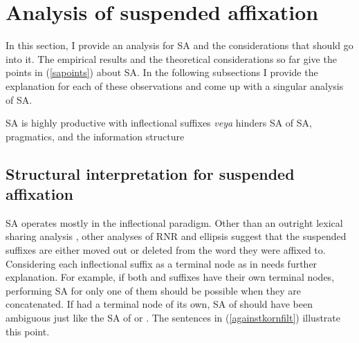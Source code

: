 \section{Analysis of suspended affixation} \label{sec:SAanalysis}

In this section, I provide an analysis for SA and the considerations that should go into it. The empirical results and the theoretical considerations so far give the points in (\ref{sapoints}) about SA. In the following subsections I provide the explanation for each of these observations and come up with a singular analysis of SA.

\begin{exe}
\ex \label{sapoints}
    \begin{xlisti}
    \ex SA is highly productive with inflectional suffixes
    \ex \textit{veya} hinders SA of {\Case} 
    \ex SA, pragmatics, and the information structure
    \end{xlisti}
\end{exe}

\subsection{Structural interpretation for suspended affixation}

SA operates mostly in the inflectional paradigm. Other than an outright lexical sharing analysis \citep{broadwell2008turkish}, other analyses of RNR \citep{kornfilt2012revisiting} and ellipsis \citep{guseva2017postsyntactic, erschler2018suspended} suggest that the suspended suffixes are either moved out or deleted from the word they were affixed to. Considering each inflectional suffix as a terminal node as in \cite{kornfilt2012revisiting} needs further explanation. For example, if both {\Pl} and {\Poss} suffixes have their own terminal nodes, performing SA for only one of them should be possible when they are concatenated. If {\Case} had a terminal node of its own, SA of {\Acc} should have been ambiguous just like the SA of {\Pl} or {\Poss}. The sentences in (\ref{againstkornfilt}) illustrate this point.

